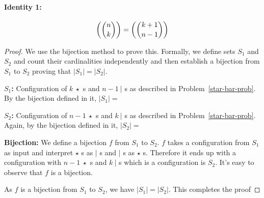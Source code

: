 \paragraph{Identity 1:} $$\textrm{$\left(\binom{n}{k}\right)$}=\textrm{$\left(\binom{k+1}{n-1}\right)$}$$
\begin{proof}
We use the bijection method to prove this. Formally, we define sets $S_1$ and $S_2$ and count their cardinalities independently and then establish a bijection from $S_1$ to $S_2$ proving that $|S_1|=|S_2|$.
\begin{description}
\item \textbf{$S_1$:} Configuration of $k~\star$ s and $n-1~|$ s as described in Problem~\ref{star-bar-prob}. By the bijection defined in it, $|S_1|=$ 
\item \textbf{$S_2$:} Configuration of $n-1~\star$ s and $k~|$ s as described in Problem~\ref{star-bar-prob}. Again, by the bijection defined in it, $|S_2|=$
\item \textbf{Bijection:} We define a bijection $f$ from $S_1$ to $S_2$. $f$ takes a configuration from $S_1$ as input and interpret $\star$ s as $|$ s and $|$ s as $\star$ s. Therefore it ends up with a configuration with $n-1~\star$ s and $k~|$ s which is a configuration is $S_2$. It's easy to observe that $f$ is a bijection.
\end{description}
As $f$ is a bijection from $S_1$ to $S_2$, we have $|S_1|=|S_2|$. This completes the proof 
\end{proof}

